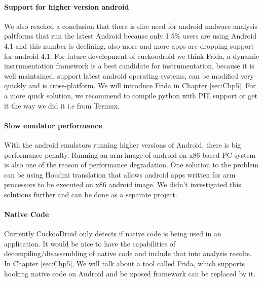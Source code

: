 \documentclass[../main.tex]{subfile}
\begin{document}
		\paragraph{Support for higher version android} We also reached a conclusion that there is dire need for android malware analysis paltforms that run the latest Android because only 1.5\% users are using Android 4.1 \cite{distribution_dashboard} and this number is declining, also more and more apps are dropping support for android 4.1. For future development of cuckoodroid we think Frida, a dynamic instrumentation framework is a best candidate for instrumentation, because it is well maintained, support latest android operating systems, can be modified very quickly and is cross-platform. We will introduce Frida in Chapter \ref{sec:Chp5}. For a more quick solution, we recommend to compile python with PIE support or get it the way we did it i.e from Termux.
		
		\paragraph{Slow emulator performance} With the android emulators running higher versions of Android, there is big performance penalty. Running an arm image of android on x86 based PC system is also one of the reason of performance degradation. One solution to the problem can be using Houdini translation that allows android apps written for arm processors to be executed on x86 android image. We didn't investigated this solutions further and can be done as a separate project.
		
		\paragraph{Native Code} Currently CuckooDroid only detects if native code is being used in an application. It would be nice to have the capabilities of decompiling/disassembling of native code and include that into analysis results. In Chapter \ref{sec:Chp5}, We will talk about a tool called Frida, which supports hooking native code on Android and be xposed framework can be replaced by it.
\end{document}
